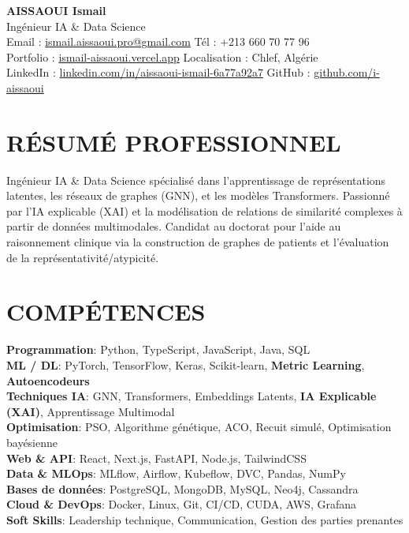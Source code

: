 \documentclass[a4paper,12pt]{article}
\begin{document}
\begin{center}
    {\Huge\bfseries\color{titleblue} AISSAOUI Ismail}\\[4pt]
    {\Large Ingénieur IA \& Data Science}\\[6pt]

    {\normalsize
    Email : \href{mailto:ismail.aissaoui.pro@gmail.com}{ismail.aissaoui.pro@gmail.com} \quad
    Tél : +213 660 70 77 96 \\
    Portfolio : \href{https://ismail-aissaoui.vercel.app}{ismail-aissaoui.vercel.app} \quad
    Localisation : Chlef, Algérie \\
    LinkedIn : \href{https://linkedin.com/in/aissaoui-ismail-6a77a92a7}{linkedin.com/in/aissaoui-ismail-6a77a92a7} \quad
    GitHub : \href{https://github.com/i-aissaoui}{github.com/i-aissaoui}
    }
\end{center}

\section{RÉSUMÉ PROFESSIONNEL}
Ingénieur IA \& Data Science spécialisé dans l'apprentissage de représentations latentes, les réseaux de graphes (GNN), et les modèles Transformers. Passionné par l'IA explicable (XAI) et la modélisation de relations de similarité complexes à partir de données multimodales. Candidat au doctorat pour l'aide au raisonnement clinique via la construction de graphes de patients et l'évaluation de la représentativité/atypicité.

\section{COMPÉTENCES}
\setlength{\parskip}{-1pt}
{\normalsize
\textbf{Programmation}: Python, TypeScript, JavaScript, Java, SQL \\

\textbf{ML / DL}: PyTorch, TensorFlow, Keras, Scikit-learn, \textbf{Metric Learning}, \textbf{Autoencodeurs} \\

\textbf{Techniques IA}: GNN, Transformers, Embeddings Latents, \textbf{IA Explicable (XAI)}, Apprentissage Multimodal \\

\textbf{Optimisation}: PSO, Algorithme génétique, ACO, Recuit simulé, Optimisation bayésienne \\

\textbf{Web \& API}: React, Next.js, FastAPI, Node.js, TailwindCSS \\

\textbf{Data \& MLOps}: MLflow, Airflow, Kubeflow, DVC, Pandas, NumPy \\

\textbf{Bases de données}: PostgreSQL, MongoDB, MySQL, Neo4j, Cassandra \\

\textbf{Cloud \& DevOps}: Docker, Linux, Git, CI/CD, CUDA, AWS, Grafana \\

\textbf{Soft Skills}: Leadership technique, Communication, Gestion des parties prenantes
}
\end{document}
